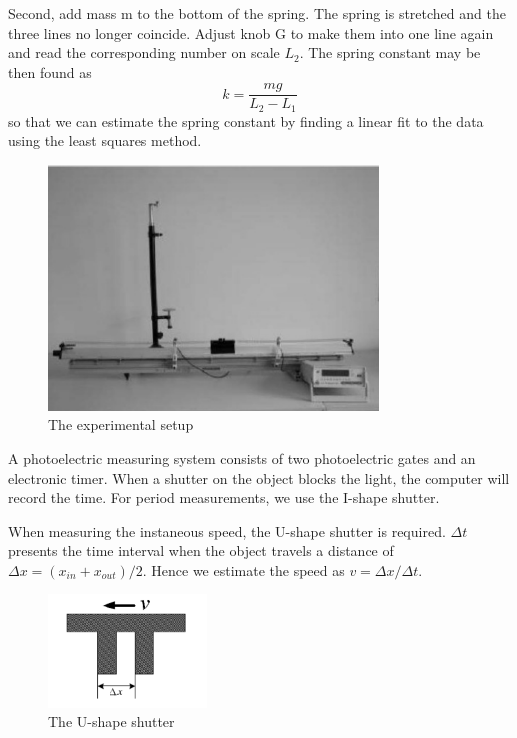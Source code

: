     Second, add mass m to the bottom of the spring. The spring is stretched and the three lines no longer coincide. Adjust knob G to make them into one line again and read the corresponding number on scale $L_2$. The spring constant may be then found as
    \begin{equation}
        k=\frac{mg}{L_2-L_1}
    \end{equation}
    so that we can estimate the spring constant by finding a linear fit to the data using the least squares method.\\

    \begin{figure}[h]
        \centering
        \label{airtrack}
        \includegraphics[height=6.5cm]{images/3.png}
        \caption{The experimental setup}
    \end{figure}

    A photoelectric measuring system consists of two photoelectric gates and an electronic timer. When a shutter on the object blocks the light, the computer will record the time. For period measurements, we use the I-shape shutter.

    When measuring the instaneous speed, the U-shape shutter is required. $\Delta t$ presents the time interval when the object travels a distance of $\Delta x=(x_{in}+x_{out})/2$. Hence we estimate the speed as $v=\Delta x/\Delta t$.

    \begin{figure}[h]
        \centering
        \label{U}
        \includegraphics[height=3cm]{images/4.png}
        \caption{The U-shape shutter}
    \end{figure}